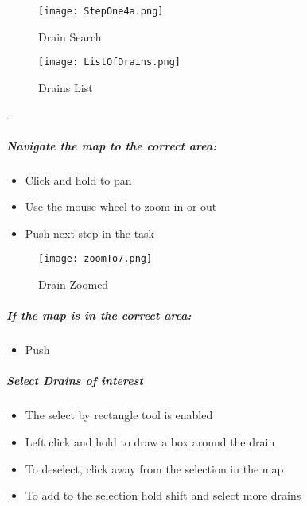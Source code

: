 \begin{figure}[h!]
 \centering
     \texttt{[image: StepOne4a.png]}
 \caption{Drain Search}
 \end{figure}

\clearpage

 \begin{wrapfigure}{r}{0.5\textwidth}
 \centering
     \texttt{[image: ListOfDrains.png]}
 \caption{Drains List}
   \end{wrapfigure}
.

\vspace{1.5in}

\vspace{.5in}
 


\clearpage

\subparagraph[Map of Drain]{Navigate the map to the correct area:}

\begin{itemize}

\item Click and hold to pan

\item Use the mouse wheel to zoom in or out

\item Push next step in the task

\end{itemize}

\begin{figure}[h!]
 \centering
     \texttt{[image: zoomTo7.png]}
 \caption{Drain Zoomed}


 \end{figure}

\subparagraph[x]{If the map is in the correct area:}

\begin{itemize}

\item Push \bigbtn {}

\end{itemize}

\clearpage

\subparagraph{Select Drains of interest}

\begin{itemize}

\item The select by rectangle tool is enabled

\item Left click and hold to draw a box around the drain

\item To deselect, click away from the selection in the map

\item To add to the selection hold shift and select more drains

\end{itemize}

